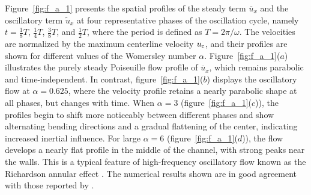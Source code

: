 \documentclass[lineno]{JFM-FLM_Au}
\begin{document}
{%

Figure~\ref{fig:f_a_1} presents the spatial profiles of the steady term $\overline{u}_x$ and the oscillatory term $\widetilde{u}_x$ at four representative phases of the oscillation cycle, namely $t = \frac{1}{8}T$, $\frac{1}{4}T$, $\frac{3}{8}T$, and $\frac{1}{2}T$, where the period is defined as $T = 2\pi/\omega$. The velocities are normalized by the maximum centerline velocity $u_{\rm c}$, and their profiles are shown for different values of the Womersley number $\alpha$.
Figure~\ref{fig:f_a_1}($a$) illustrates the purely steady Poiseuille flow profile of $\overline{u}_x$, which remains parabolic and time-independent. In contrast, figure~\ref{fig:f_a_1}($b$) displays the oscillatory flow at $\alpha = 0.625$, where the velocity profile retains a nearly parabolic shape at all phases, but changes with time. When $\alpha = 3$ (figure~\ref{fig:f_a_1}($c$)), the profiles begin to shift more noticeably between different phases and show alternating bending directions and a gradual flattening of the center, indicating increased inertial influence. For large $\alpha = 6$ (figure~\ref{fig:f_a_1}($d$)), 
the flow develops a nearly flat profile in the middle of the channel, with strong peaks near the walls. This is a typical feature of high-frequency oscillatory flow known as the Richardson annular effect \citep{richardson1929transverse}. The numerical results shown are in good agreement with those reported by \cite{ma2017theoretical}.

}
\end{document}
